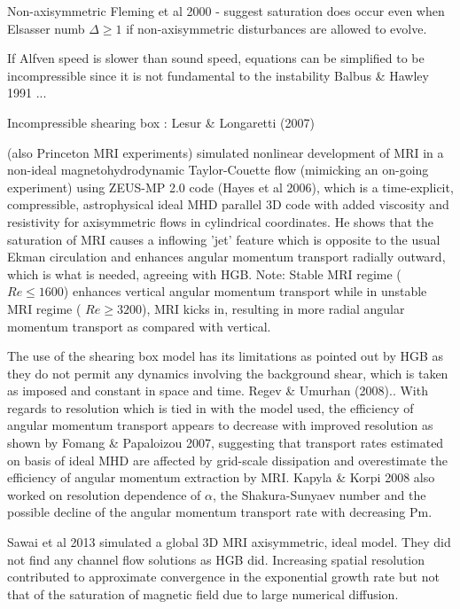 \documentclass{jfm}
\begin{document}
Non-axisymmetric Fleming et al 2000 \cite{Fleming2000} - suggest saturation does occur even when Elsasser numb $\Delta \ge 1$ if non-axisymmetric disturbances are allowed to evolve.

If Alfven speed is slower than sound speed, equations can be simplified to be incompressible since it is not fundamental to the instability Balbus \& Hawley 1991 \cite{Balbus1991} ...

Incompressible shearing box : Lesur \& Longaretti (2007) \cite{Lesur2007}

\cite{Liu2008} (also Princeton MRI experiments) simulated nonlinear development of MRI in a non-ideal magnetohydrodynamic Taylor-Couette flow (mimicking an on-going experiment) using ZEUS-MP 2.0 code (Hayes et al 2006), which is a time-explicit, compressible, astrophysical ideal MHD parallel 3D code with added viscosity and resistivity for axisymmetric flows in cylindrical coordinates. He shows that the saturation of MRI causes a inflowing 'jet' feature which is opposite to the usual Ekman circulation and enhances angular momentum transport radially outward, which is what is needed, agreeing with HGB. Note: Stable MRI regime ($ Re \le 1600$) enhances vertical angular momentum transport while in unstable MRI regime ( $ Re \ge 3200$), MRI kicks in, resulting in more radial angular momentum transport as compared with vertical.

The use of the shearing box model has its limitations as pointed out by HGB as they do not permit any dynamics involving the background shear, which is taken as imposed and constant in space and time. Regev \& Umurhan (2008).. With regards to resolution which is tied in with the model used, the efficiency of angular momentum transport appears to decrease with improved resolution as shown by Fomang \& Papaloizou 2007, suggesting that transport rates estimated on basis of ideal MHD are affected by grid-scale dissipation and overestimate the efficiency of angular momentum extraction by MRI. Kapyla \& Korpi 2008 \cite{Kapyla2008} also worked on resolution dependence of $\alpha$, the Shakura-Sunyaev number and the possible decline of the angular momentum transport rate with decreasing Pm.

Sawai et al 2013 \cite{Sawai2013} simulated a global 3D MRI axisymmetric, ideal model. They did not find any channel flow solutions as HGB did. Increasing spatial resolution contributed to approximate convergence in the exponential growth rate but not that of the saturation of magnetic field due to large numerical diffusion.
\end{document}
